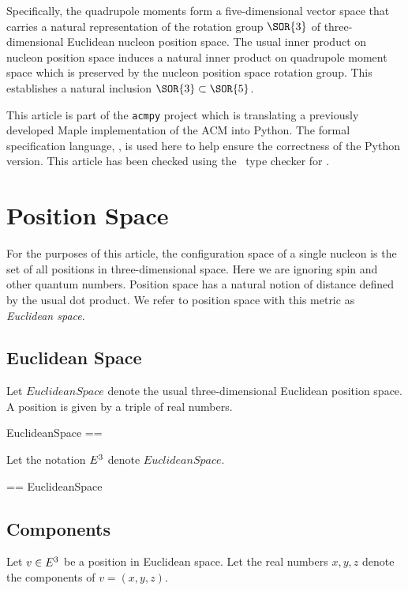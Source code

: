 \documentclass{amsart}
\begin{document}
Specifically, the quadrupole moments form a five-dimensional vector space that carries a natural representation
of the rotation group $\SOR{3}$ of three-dimensional Euclidean nucleon position space.
The usual inner product on nucleon position space induces a natural inner product on quadrupole moment space which is
preserved by the nucleon position space rotation group. This establishes a natural inclusion $\SOR{3} \subset \SOR{5}$.

This article is part of the \texttt{acmpy} project which is translating a previously developed Maple implementation of the ACM
into Python.
The formal specification language, \ZN, is used here to help ensure the correctness of the Python version.
This article has been checked using the \fuzz\ type checker for \ZN.

\section{Position Space}

For the purposes of this article, the configuration space of a single nucleon is the set of all positions in three-dimensional space.
Here we are ignoring spin and other quantum numbers.
Position space has a natural notion of distance defined by the usual dot product.
We refer to position space with this metric as \textit{Euclidean space}.

\subsection{Euclidean Space}

Let $EuclideanSpace$ denote the usual three-dimensional Euclidean position space.
A position is given by a triple of real numbers.

\begin{zed}
	EuclideanSpace == \R \cross \R \cross \R
\end{zed}

Let the notation $E^3$ denote $EuclideanSpace$.

\begin{zed}
	\Ethree == EuclideanSpace
\end{zed}

\subsection{Components}

Let $v \in E^3$ be a position in Euclidean space. 
Let the real numbers $x, y, z$ denote the components of $v = (x, y, z)$.
\end{document}
